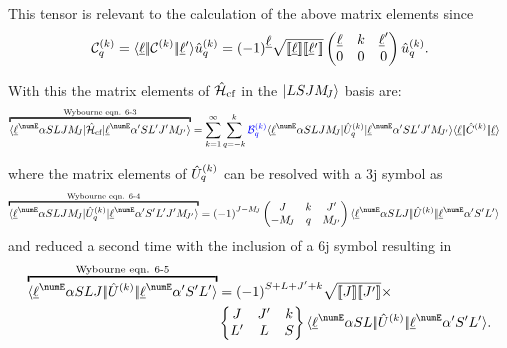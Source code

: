\documentclass{article}
\begin{document}
    This tensor is relevant to the calculation of the above matrix elements since 
    \begin{equation}
        \mathcal{C}^{(k)}_{q} = \langle \underbar{$\ell$}|\!|\mathcal{C}^{(k)}|\!|\underbar{$\ell$}{'}\rangle \hat{u}^{(k)}_q 
            = {(-1)}^{\underbar{$\ell$}}
            \sqrt{[\![\underbar{$\ell$}]\!][\![\underbar{$\ell$}{'}]\!]}
            \begin{pmatrix} \underbar{$\ell$} & k & \underbar{$\ell$}' \\ 0 & 0 & 0 \end{pmatrix} \hat{u}^{(k)}_q.
    \end{equation}

    With this the matrix elements of $\hat{\mathcal{H}}_\text{cf}$ in the $|LSJM_{\!{J}}\rangle$ basis are: 
    \begin{align}
        \overbracket{\braopket{\lorb^\numE \alpha SLJ \Msub{J}}{\hamCrystalFieldSymbol}{\lorb^\numE \alpha'S L' J' \Msub{J'}}}^{\text{Wybourne eqn. 6-3}} &= \sum_{k=1}^\infty\sum_{q=-k}^k    
        \Bcomplexkq{k}{q} 
            \braopket{\lorb^\numE \alpha SLJ\Msub{J}}
                {\op{U}^{(k)}_q}
                {\lorb^\numE \alpha'SL'J'\Msub{J'}} 
            \redbraopket{\lorb}
                {\op{C}^{(k)}}
                {\lorb} 
    \label{HCFsum}
    \end{align}

    where the matrix elements of $\hat{U}^{(k)}_q$ can be resolved with a 3j symbol as
    \begin{align}
        \overbracket{\braopket{\lorb^\numE \alpha S L J \Msub{J}}
            {\op{U}^{(k)}_q}
            {\lorb^\numE \alpha' S' L' J' \Msub{J'}}}^
            {\text{Wybourne eqn. 6-4}}
            &= 
            \phaser{J-\Msub{J}}
            \threej{J}{k}{J'}
                {-\Msub{J}}{q}{\Msub{J'}}
        \redbraopket{\lorb^\numE \alpha S L J}
                {\op{U}^{(k)}}
                {\lorb^\numE \alpha' S' L'}
    \end{align}
    and reduced a second time with the inclusion of a 6j symbol resulting in
    \begin{align}
        \nonumber \overbracket{\redbraopket{\lorb^\numE \alpha S L J}
            {\op{U}^{(k)}}
            {\lorb^\numE \alpha' S' L'}}^
            {\text{Wybourne eqn. 6-5}}
        &= 
        \phaser{S+L+J'+k} 
        \sqrt{\tpobraket{J}\tpobraket{J'}} \times \\
        & \sixj{J}{J'}{k}{L'}{L}{S}
        \redbraopket{\lorb^\numE \alpha S L}
            {\op{U}^{(k)}}
            {\lorb^\numE \alpha' S' L'}.
    \end{align}
\end{document}

